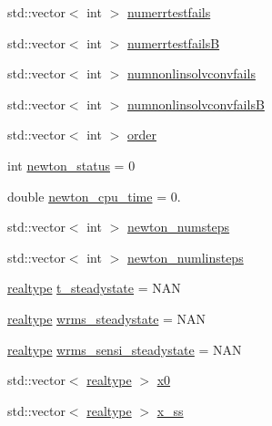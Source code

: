 \begin{DoxyCompactItemize}
\item 
std\+::vector$<$ int $>$ \mbox{\hyperlink{classamici_1_1_return_data_aea0bfe23fb5971a5348a3d017a859488}{numerrtestfails}}
\item 
std\+::vector$<$ int $>$ \mbox{\hyperlink{classamici_1_1_return_data_a894f4cf4dbdd38dda12c5730fb04482d}{numerrtestfailsB}}
\item 
std\+::vector$<$ int $>$ \mbox{\hyperlink{classamici_1_1_return_data_a67818adc34db21fb3d78731c0e60462a}{numnonlinsolvconvfails}}
\item 
std\+::vector$<$ int $>$ \mbox{\hyperlink{classamici_1_1_return_data_a9150501f058304e49bb6a52152cc9550}{numnonlinsolvconvfailsB}}
\item 
std\+::vector$<$ int $>$ \mbox{\hyperlink{classamici_1_1_return_data_a75a1634d2dab77d47af4eb58e6dc965e}{order}}
\item 
int \mbox{\hyperlink{classamici_1_1_return_data_a7a12031049f81ccdd4496bd4506c6d28}{newton\+\_\+status}} = 0
\item 
double \mbox{\hyperlink{classamici_1_1_return_data_a848d9dd3e74e2a55652ae304ac18687c}{newton\+\_\+cpu\+\_\+time}} = 0.
\item 
std\+::vector$<$ int $>$ \mbox{\hyperlink{classamici_1_1_return_data_ae8d9136bb7510303556f9935a15b9318}{newton\+\_\+numsteps}}
\item 
std\+::vector$<$ int $>$ \mbox{\hyperlink{classamici_1_1_return_data_a08ca5d9be9ff8f50955327334e5e87bb}{newton\+\_\+numlinsteps}}
\item 
\mbox{\hyperlink{namespaceamici_a1bdce28051d6a53868f7ccbf5f2c14a3}{realtype}} \mbox{\hyperlink{classamici_1_1_return_data_ae6c276c43addc2845ce72e7188924cc4}{t\+\_\+steadystate}} = N\+AN
\item 
\mbox{\hyperlink{namespaceamici_a1bdce28051d6a53868f7ccbf5f2c14a3}{realtype}} \mbox{\hyperlink{classamici_1_1_return_data_ad044a0dd6c510ee74c8122767c25d6cb}{wrms\+\_\+steadystate}} = N\+AN
\item 
\mbox{\hyperlink{namespaceamici_a1bdce28051d6a53868f7ccbf5f2c14a3}{realtype}} \mbox{\hyperlink{classamici_1_1_return_data_ae10f7eece540838884f18b379083fc8f}{wrms\+\_\+sensi\+\_\+steadystate}} = N\+AN
\item 
std\+::vector$<$ \mbox{\hyperlink{namespaceamici_a1bdce28051d6a53868f7ccbf5f2c14a3}{realtype}} $>$ \mbox{\hyperlink{classamici_1_1_return_data_a9089beccffa9671a052e3065166dce53}{x0}}
\item 
std\+::vector$<$ \mbox{\hyperlink{namespaceamici_a1bdce28051d6a53868f7ccbf5f2c14a3}{realtype}} $>$ \mbox{\hyperlink{classamici_1_1_return_data_a0507393d3010570a9740eb50287f83eb}{x\+\_\+ss}}

\end{DoxyCompactItemize}
